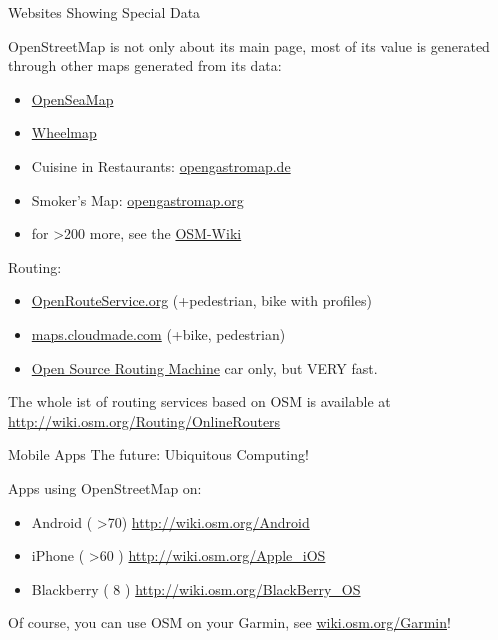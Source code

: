 \documentclass{beamer}
\begin{document}
\begin{frame}{Websites Showing Special Data}

OpenStreetMap is not only about its main page, most of its value is generated through other maps generated from its data:

\begin{itemize}
  \item \href{http://www.openseamap.org/}{OpenSeaMap}
  \item \href{http://wiki.openstreetmap.org/wiki/Wheelmap}{Wheelmap}
  \item Cuisine in Restaurants: \href{http://www.opengastromap.de/?lat=47.07&lon=15.43&zoom=12}{opengastromap.de}
  \item Smoker's Map: \href{http://toolserver.org/~stephankn/smoking/}{opengastromap.org}
    \pause
  \item for \textgreater200 more, see the \href{http://wiki.openstreetmap.org/wiki/List\_of\_OSM\_based\_Services}{OSM-Wiki}
\end{itemize}
\end{frame}

\begin{frame}{Routing:}


\begin{itemize}
  \item \url{OpenRouteService.org} (+pedestrian, bike with profiles)
  \item \url{maps.cloudmade.com} (+bike, pedestrian)
  \item \href{http://osrm.at/2eq}{Open Source Routing Machine} car only, but VERY fast.
\end{itemize}
The whole ist of routing services based on OSM is available at \url{http://wiki.osm.org/Routing/OnlineRouters}
\end{frame}

\begin{frame}{Mobile Apps}
  The future: Ubiquitous Computing!
  
  \pause

  Apps using OpenStreetMap on:

\begin{itemize}
  \item  Android ( \textgreater 70) \url{http://wiki.osm.org/Android}
  \item  iPhone ( \textgreater 60 )  \url{http://wiki.osm.org/Apple\_iOS}
  \item  Blackberry ( 8 ) \url{http://wiki.osm.org/BlackBerry\_OS}
\end{itemize}

Of course, you can use OSM on your Garmin, see \href{http://wiki.osm.org/Garmin}{wiki.osm.org/Garmin}!

\end{frame}
\end{document}
